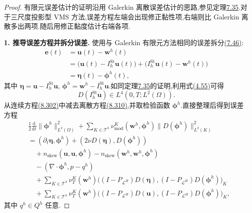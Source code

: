 \begin{proof}
有限元误差估计的证明沿用 Galerkin 离散误差估计的思路,参见定理\hyperref[thm:time-dependent-fem-velocity-error]{7.35}.对于三尺度投影型 VMS 方法,误差方程左端会出现修正黏性项,右端则比 Galerkin 离散多出两项.随后用修正黏度估计右端各项.

\textbf{1. 推导误差方程并拆分误差.} 使用与 Galerkin 有限元方法相同的误差拆分\hyperref[eq:time-dependent-fem-error-splitting]{(7.46)}:
\[
\begin{aligned}
 \bm e(t)&=\bm u(t)-\bm w^h(t)\\
 &=\bigl(\bm u(t)-I_h^{\mathrm{St}}\bm u(t)\bigr)
   +\bigl(I_h^{\mathrm{St}}\bm u(t)-\bm w^h(t)\bigr)\\
 &=\symbf{\eta}(t)-\symbf{\phi}^h(t),
\end{aligned}
\]
其中 $\symbf{\eta}=\bm u-I_h^{\mathrm{St}}\bm u$,
$\symbf{\phi}^h=\bm w^h-I_h^{\mathrm{St}}\bm u$.如同定理\hyperref[thm:time-dependent-fem-velocity-error]{7.35}的证明,利用式\hyperref[eq:stokes-projection-stability-velocity]{(4.55)}可得
\begin{equation}\label{eq:vms-coarse-projection-stokes-gradient-regularity}
 D(I_h^{\mathrm{St}}\bm u)\in L^4(0,T;L^2(\Omega)).
\end{equation}
从连续方程\hyperref[eq:vms-coarse-projection-continuous-equation]{(8.302)}中减去离散方程\hyperref[eq:vms-coarse-projection-divergence-free-method]{(8.310)},并取检验函数 $\symbf{\phi}^h$.直接整理后得到误差方程
\begin{equation}\label{eq:vms-coarse-projection-error-equation}
\begin{aligned}
 &\frac12\frac{\mathrm d}{\mathrm dt}
     \|\symbf{\phi}^h\|_{L^2(\Omega)}^2
  +\sum_{K\in\mathcal T^h}
     \nu_{\mathrm{mod}}^K(\bm w^h,\symbf{\phi}^h)
     \|D(\symbf{\phi}^h)\|_{L^2(K)}^2\\
 &= (\partial_t\symbf{\eta},\symbf{\phi}^h)
    +(2\nu D(\symbf{\eta}),D(\symbf{\phi}^h))\\
 &\quad+n_{\mathrm{skew}}(\bm u,\bm u,\symbf{\phi}^h)
      -n_{\mathrm{skew}}(\bm w^h,\bm w^h,\symbf{\phi}^h)\\
 &\quad-(\nabla\cdot\symbf{\phi}^h,p-q^h)\\
 &\quad+\sum_{K\in\mathcal T^h}\nu_T^K(\bm w^h)
    \bigl((I-P_{\mathcal L^H})D(\symbf{\eta}),
          (I-P_{\mathcal L^H})D(\symbf{\phi}^h)\bigr)_K\\
 &\quad+\sum_{K\in\mathcal T^h}\nu_T^K(\bm w^h)
    \bigl((I-P_{\mathcal L^H})D(\bm u),
          (I-P_{\mathcal L^H})D(\symbf{\phi}^h)\bigr)_K,
\end{aligned}
\end{equation}
其中 $q^h\in Q^h$ 任意.


\end{proof}
